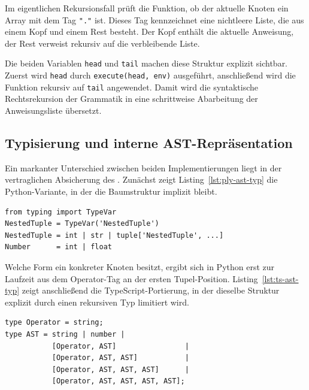 Im eigentlichen Rekursionsfall prüft die Funktion, ob der aktuelle Knoten ein Array mit dem Tag \texttt{"."} ist. Dieses Tag kennzeichnet eine nichtleere Liste, die aus einem Kopf und einem Rest besteht. Der Kopf enthält die aktuelle Anweisung, der Rest verweist rekursiv auf die verbleibende Liste.

Die beiden Variablen \texttt{head} und \texttt{tail} machen diese Struktur explizit sichtbar. Zuerst wird \texttt{head} durch \texttt{execute(head, env)} ausgeführt, anschließend wird die Funktion rekursiv auf \texttt{tail} angewendet. Damit wird die syntaktische Rechtsrekursion der Grammatik in eine schrittweise Abarbeitung der Anweisungsliste übersetzt.

\subsection{Typisierung und interne AST-Repräsentation}

Ein markanter Unterschied zwischen beiden Implementierungen liegt in der vertraglichen Absicherung des . Zunächst zeigt Listing~\ref{lst:ply-ast-typ} die Python-Variante, in der die Baumstruktur implizit bleibt.

\begin{listing}[htbp]
\caption{AST-Typmodellierung in Python}
\label{lst:ply-ast-typ}
\begin{verbatim}
from typing import TypeVar
NestedTuple = TypeVar('NestedTuple')
NestedTuple = int | str | tuple['NestedTuple', ...]
Number      = int | float
\end{verbatim}
\end{listing}

Welche Form ein konkreter Knoten besitzt, ergibt sich in Python erst zur Laufzeit aus dem Operator-Tag an der ersten Tupel-Position. Listing~\ref{lst:ts-ast-typ} zeigt anschließend die TypeScript-Portierung, in der dieselbe Struktur explizit durch einen rekursiven Typ limitiert wird.

\begin{listing}[htbp]
\caption{AST-Typdefinition in TypeScript}
\label{lst:ts-ast-typ}
\begin{verbatim}
type Operator = string;
type AST = string | number |
           [Operator, AST]                |
           [Operator, AST, AST]           |
           [Operator, AST, AST, AST]      |
           [Operator, AST, AST, AST, AST];
\end{verbatim}
\end{listing}

